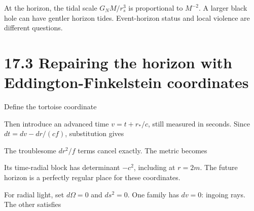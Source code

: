 \documentclass[
  11pt,
  letterpaper,
  oneside,
  openany]{scrbook}
\begin{document}
At the horizon, the tidal scale \(G_NM/r_s^3\) is proportional to
\(M^{-2}\). A larger black hole can have gentler horizon tides.
Event-horizon status and local violence are different questions.

\hypertarget{repairing-the-horizon-with-eddington-finkelstein-coordinates}{%
\section{17.3 Repairing the horizon with Eddington-Finkelstein
coordinates}\label{repairing-the-horizon-with-eddington-finkelstein-coordinates}}

Define the tortoise coordinate

\begin{center}
\begingroup
{}
\ifdim\wd\grmathbox>\linewidth
\resizebox{\linewidth}{!}{\usebox{\grmathbox}}
\else\usebox{\grmathbox}\fi
\endgroup
\end{center}

Then introduce an advanced time \(v=t+r_*/c\), still measured in
seconds. Since \(dt=dv-dr/(cf)\), substitution gives

\begin{center}
\begingroup
{}
\ifdim\wd\grmathbox>\linewidth
\resizebox{\linewidth}{!}{\usebox{\grmathbox}}
\else\usebox{\grmathbox}\fi
\endgroup
\end{center}

The troublesome \(dr^2/f\) terms cancel exactly. The metric becomes

\begin{center}
\begingroup
{}
\ifdim\wd\grmathbox>\linewidth
\resizebox{\linewidth}{!}{\usebox{\grmathbox}}
\else\usebox{\grmathbox}\fi
\endgroup
\end{center}

Its time-radial block has determinant \(-c^2\), including at \(r=2m\).
The future horizon is a perfectly regular place for these coordinates.

For radial light, set \(d\Omega=0\) and \(ds^2=0\). One family has
\(dv=0\): ingoing rays. The other satisfies
\end{document}
